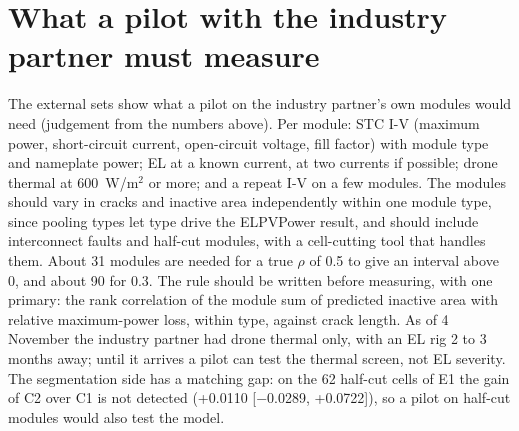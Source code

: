 \section{What a pilot with the industry partner must measure}
\label{sec:deploy-pilot}

The external sets show what a pilot on the industry partner's own modules would need (judgement from the numbers above). Per module: STC I-V
(maximum power, short-circuit current, open-circuit voltage, fill factor) with module type and nameplate power; EL at a known
current, at two currents if possible; drone thermal at 600~W/m$^2$ or more; and a repeat I-V on a few modules. The modules should vary in cracks and inactive area independently within one
module type, since pooling types let type drive the ELPVPower result, and should include interconnect faults and half-cut modules,
with a cell-cutting tool that handles them. About 31 modules are needed for a true $\rho$ of 0.5 to give an interval above 0, and
about 90 for 0.3. The rule should be written before measuring, with one primary: the rank correlation of the module sum of predicted
inactive area with relative maximum-power loss, within type, against crack length. As of 4 November the industry partner had drone thermal only,
with an EL rig 2 to 3 months away; until it arrives a pilot can test the thermal screen, not EL severity. The segmentation side has a
matching gap: on the 62 half-cut cells of E1 the gain of C2 over C1 is not detected (+0.0110 [$-$0.0289, +0.0722]), so a pilot on
half-cut modules would also test the model.
